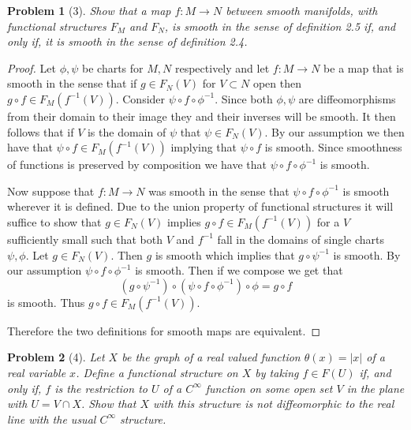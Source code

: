 \documentclass[10pt]{article}
\newcommand{\sk}{\vskip 10mm}
\theoremstyle{plain}
\newtheorem{problem}{Problem}
\theoremstyle{remark}
\begin{document}
\sk

\begin{problem}[3]
  Show that a map $f:M\rightarrow N$ between smooth manifolds, with functional
  structures $F_M$ and $F_N$, is smooth in the sense of definition 2.5
  if, and only if, it is smooth in the sense of definition 2.4.
\end{problem}

\begin{proof}
  Let $\phi,\psi$ be charts for $M,N$ respectively and let $f:M\rightarrow N$ be a map that
  is smooth in the sense that if $g\in F_N(V)$ for $V\subset N$ open then
  $g\circ f\in F_M(f^{-1}(V))$. Consider $\psi\circ f\circ \phi^{-1}$. Since both $\phi,\psi$ are diffeomorphisms
  from their domain to their image they and their inverses will be smooth. It then
  follows that if $V$ is the domain of $\psi$ that $\psi\in F_N(V)$. By
  our assumption we then have that $\psi\circ f\in F_M(f^{-1}(V))$ implying that
  $\psi\circ f$ is smooth. Since smoothness of functions is preserved by composition
  we have that $\psi\circ f\circ\phi^{-1}$ is smooth.

  Now suppose that $f:M\rightarrow N$ was smooth in the sense that $\psi\circ f\circ \phi^{-1}$ is smooth
  wherever it is defined. Due to the union property of functional structures
  it will suffice to show that $g\in F_N(V)$ implies $g\circ f\in F_M(f^{-1}(V))$
  for a $V$ sufficiently small such that both $V$ and $f^{-1}$ fall in the
  domains of single charts $\psi,\phi$. Let $g\in F_N(V)$. Then $g$ is smooth
  which implies that $g\circ\psi^{-1}$ is smooth. By our assumption
  $\psi\circ f\circ \phi^{-1}$ is smooth. Then if we compose we get that
  \[ (g\circ\psi^{-1})\circ(\psi\circ f\circ\phi^{-1})\circ\phi =g\circ f\]
  is smooth. Thus $g\circ f\in F_M(f^{-1}(V))$.

  Therefore the two definitions for smooth maps are equivalent.
\end{proof}

\sk

\begin{problem}[4]
  Let $X$ be the graph of a real valued function $\theta(x)=|x|$ of a real
  variable $x$. Define a functional structure on $X$ by taking $f\in F(U)$
  if, and only if, $f$ is the restriction to $U$ of a $C^\infty$ function on some
  open set $V$ in the plane with $U=V\cap X$. Show that $X$ with this structure
  is \textit{not} diffeomorphic to the real line with the usual $C^\infty$ structure.
\end{problem}
\end{document}
